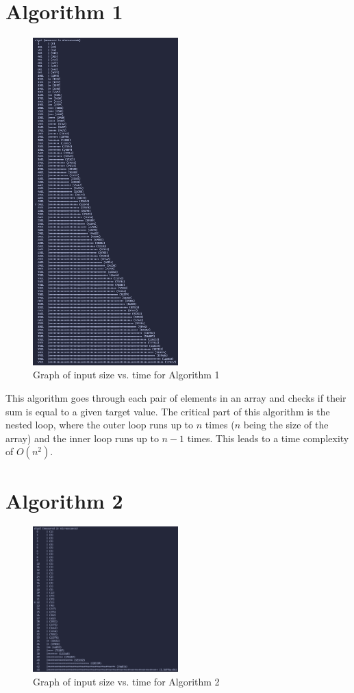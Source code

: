 \documentclass{article}
\begin{document}
\section*{Algorithm 1}
\begin{figure}[H]
    \centering
    \includegraphics[width=0.5\textwidth]{./images/algo1.png}
    \caption{Graph of input size vs. time for Algorithm 1}
\end{figure}

This algorithm goes through each pair of elements in an array and checks if their sum is equal to a given target value.
The critical part of this algorithm is the nested loop, where the outer loop runs up to $n$ times ($n$ being the size of the array) and the inner loop runs up to $n-1$ times. 
This leads to a time complexity of $O(n^2)$.

\section*{Algorithm 2}
\begin{figure}[H]
    \centering
    \includegraphics[width=0.5\textwidth]{./images/algo2.png}
    \caption{Graph of input size vs. time for Algorithm 2}
\end{figure}
\end{document}
